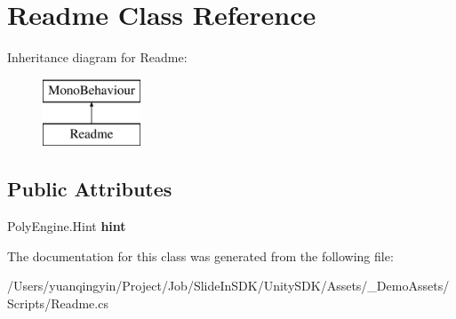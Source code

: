 \hypertarget{class_readme}{}\section{Readme Class Reference}
\label{class_readme}
Inheritance diagram for Readme\+:\begin{figure}[H]
\begin{center}
\leavevmode
\includegraphics[height=2.000000cm]{class_readme}
\end{center}
\end{figure}
\subsection*{Public Attributes}
\begin{DoxyCompactItemize}
\item 
\mbox{\label{class_readme_a5a499b7cafbc6c59eb752d875e21f1f4}} 
Poly\+Engine.\+Hint {\bfseries hint}
\end{DoxyCompactItemize}


The documentation for this class was generated from the following file\+:\begin{DoxyCompactItemize}
\item 
/\+Users/yuanqingyin/\+Project/\+Job/\+Slide\+In\+S\+D\+K/\+Unity\+S\+D\+K/\+Assets/\+\_\+\+Demo\+Assets/\+Scripts/Readme.\+cs\end{DoxyCompactItemize}
